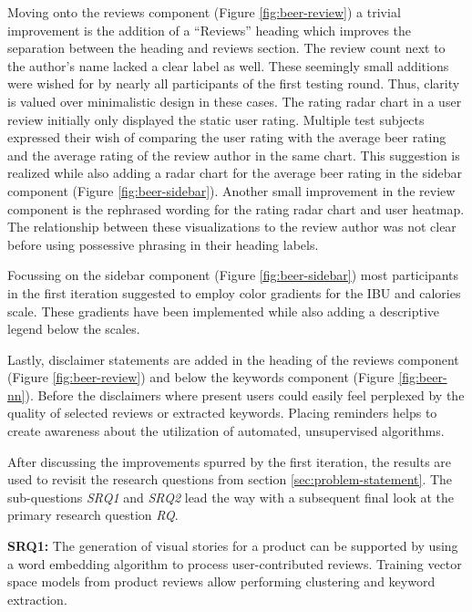 Moving onto the reviews component (Figure \ref{fig:beer-review}) a trivial improvement is the addition of a ``Reviews'' heading which improves the separation between the heading and reviews section.
The review count next to the author's name lacked a clear label as well.
These seemingly small additions were wished for by nearly all participants of the first testing round.
Thus, clarity is valued over minimalistic design in these cases.
The rating radar chart in a user review initially only displayed the static user rating.
Multiple test subjects expressed their wish of comparing the user rating with the average beer rating and the average rating of the review author in the same chart.
This suggestion is realized while also adding a radar chart for the average beer rating in the sidebar component (Figure \ref{fig:beer-sidebar}).
Another small improvement in the review component is the rephrased wording for the rating radar chart and user heatmap.
The relationship between these visualizations to the review author was not clear before using possessive phrasing in their heading labels.

Focussing on the sidebar component (Figure \ref{fig:beer-sidebar}) most participants in the first iteration suggested to employ color gradients for the IBU and calories scale.
These gradients have been implemented while also adding a descriptive legend below the scales.

Lastly, disclaimer statements are added in the heading of the reviews component (Figure \ref{fig:beer-review}) and below the keywords component (Figure \ref{fig:beer-nn}).
Before the disclaimers where present users could easily feel perplexed by the quality of selected reviews or extracted keywords.
Placing reminders helps to create awareness about the utilization of automated, unsupervised algorithms.

After discussing the improvements spurred by the first iteration, the results are used to revisit the research questions from section \ref{sec:problem-statement}.
The sub-questions \emph{SRQ1} and \emph{SRQ2} lead the way with a subsequent final look at the primary research question \emph{RQ}.

\hfill

\noindent
\textbf{SRQ1:} The generation of visual stories for a product can be supported by using a word embedding algorithm to process user-contributed reviews.
Training vector space models from product reviews allow performing clustering and keyword extraction.

